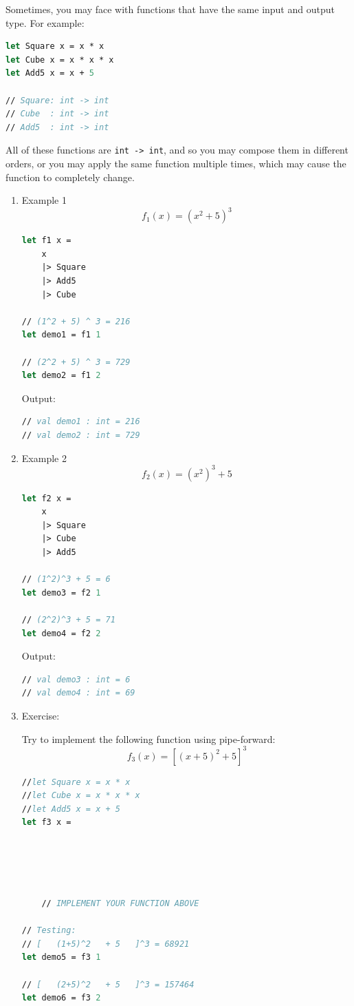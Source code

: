 \documentclass[12pt]{article}
\begin{document}
Sometimes, you may face with functions that have the same input and output type. For example:
\begin{lstlisting}[language=FSharp]
let Square x = x * x
let Cube x = x * x * x
let Add5 x = x + 5

// Square: int -> int
// Cube  : int -> int
// Add5  : int -> int
\end{lstlisting}
All of these functions are \texttt{int -> int}, and so you may compose them in different orders, or you may apply the same function multiple times, which may cause the function to completely change.
\begin{enumerate}
\item Example 1
\[
f_1(x) = \left(x^2 + 5\right)^3
\]
\begin{lstlisting}[language=FSharp]
let f1 x = 
    x
    |> Square
    |> Add5
    |> Cube
    
// (1^2 + 5) ^ 3 = 216
let demo1 = f1 1

// (2^2 + 5) ^ 3 = 729
let demo2 = f1 2
\end{lstlisting}
Output:
\begin{lstlisting}[language=FSharp]
// val demo1 : int = 216
// val demo2 : int = 729
\end{lstlisting}

\pagebreak
\item Example 2
\[
f_2(x) = \left(x^2\right)^3 + 5
\]
\begin{lstlisting}[language=FSharp]
let f2 x =
    x
    |> Square
    |> Cube
    |> Add5
    
// (1^2)^3 + 5 = 6
let demo3 = f2 1

// (2^2)^3 + 5 = 71
let demo4 = f2 2
\end{lstlisting}
Output:
\begin{lstlisting}[language=FSharp]
// val demo3 : int = 6
// val demo4 : int = 69
\end{lstlisting}
\item Exercise:

Try to implement the following function using pipe-forward:
\[
f_3(x) = \left[\left(x + 5\right)^2 + 5\right]^3
\]
\begin{lstlisting}[language=FSharp]
//let Square x = x * x
//let Cube x = x * x * x
//let Add5 x = x + 5
let f3 x =





	// IMPLEMENT YOUR FUNCTION ABOVE

// Testing:
// [   (1+5)^2   + 5   ]^3 = 68921
let demo5 = f3 1

// [   (2+5)^2   + 5   ]^3 = 157464
let demo6 = f3 2
\end{lstlisting}
\end{enumerate}
\end{document}
